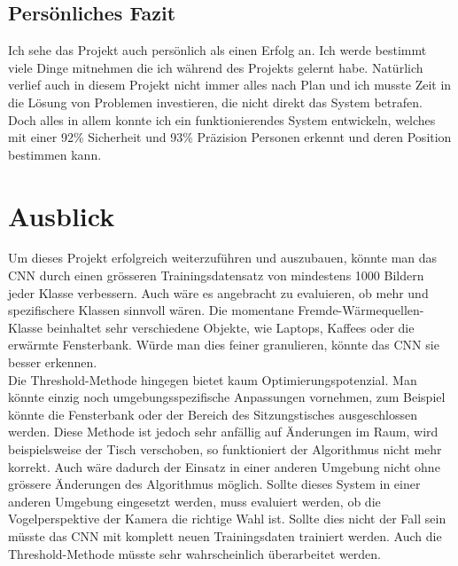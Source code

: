 \subsection{Persönliches Fazit}

Ich sehe das Projekt auch persönlich als einen Erfolg an. Ich werde bestimmt viele Dinge mitnehmen die ich während des Projekts gelernt habe. Natürlich verlief auch in diesem Projekt nicht immer alles nach Plan und ich musste Zeit in die Lösung von Problemen investieren, die nicht direkt das System betrafen. Doch alles in allem konnte ich ein funktionierendes System entwickeln, welches mit einer 92\% Sicherheit und 93\% Präzision Personen erkennt und deren Position bestimmen kann.

\section{Ausblick}
Um dieses Projekt erfolgreich weiterzuführen und auszubauen, könnte man das \gls{CNN} durch einen grösseren Trainingsdatensatz von mindestens 1000 Bildern jeder Klasse verbessern. Auch wäre es angebracht zu evaluieren, ob mehr und spezifischere Klassen sinnvoll wären. Die momentane Fremde-Wärmequellen-Klasse beinhaltet sehr verschiedene Objekte, wie Laptops, Kaffees oder die erwärmte Fensterbank. Würde man dies feiner granulieren, könnte das \gls{CNN} sie besser erkennen.\\
Die Threshold-Methode hingegen bietet kaum Optimierungspotenzial. Man könnte einzig noch umgebungsspezifische Anpassungen vornehmen, zum Beispiel könnte die Fensterbank oder der Bereich des Sitzungstisches ausgeschlossen werden. Diese Methode ist jedoch sehr anfällig auf Änderungen im Raum, wird beispielsweise der Tisch verschoben, so funktioniert der Algorithmus nicht mehr korrekt. Auch wäre dadurch der Einsatz in einer anderen Umgebung nicht ohne grössere Änderungen des Algorithmus möglich. Sollte dieses System in einer anderen Umgebung eingesetzt werden, muss evaluiert werden, ob die Vogelperspektive der Kamera die richtige Wahl ist. Sollte dies nicht der Fall sein müsste das CNN mit komplett neuen Trainingsdaten trainiert werden. Auch die Threshold-Methode müsste sehr wahrscheinlich überarbeitet werden.

